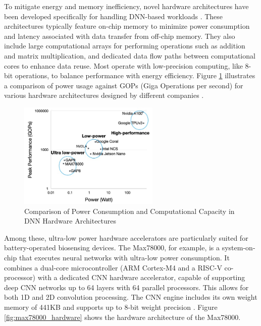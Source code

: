 \noindent To mitigate energy and memory inefficiency, novel hardware architectures have been developed specifically for handling DNN-based workloads \cite{Moss2023, Reuther2021}. These architectures typically feature on-chip memory to minimize power consumption and latency associated with data transfer from off-chip memory. They also include large computational arrays for performing operations such as addition and matrix multiplication, and dedicated data flow paths between computational cores to enhance data reuse. Most operate with low-precision computing, like 8-bit operations, to balance performance with energy efficiency. Figure \ref{fig:dnn_hardware_comparison} illustrates a comparison of power usage against GOPs (Giga Operations per second) for various hardware architectures designed by different companies \cite{Moss2023}.\\

\begin{figure}[h]
	\centering
	\includegraphics[width=0.6\textwidth]{images/power vs gops}
	\caption{Comparison of Power Consumption and Computational Capacity in DNN Hardware Architectures~\cite{Moss2023}}
	\label{fig:dnn_hardware_comparison}
\end{figure}

\noindent Among these, ultra-low power hardware accelerators are particularly suited for battery-operated biosensing devices. The Max78000, for example, is a system-on-chip that executes neural networks with ultra-low power consumption. It combines a dual-core microcontroller (ARM Cortex-M4 and a RISC-V co-processor) with a dedicated CNN hardware accelerator, capable of supporting deep CNN networks up to 64 layers with 64 parallel processors. This allows for both 1D and 2D convolution processing. The CNN engine includes its own weight memory of 441KB and supports up to 8-bit weight precision \cite{MAX78000-datasheet}. Figure \ref{fig:max78000_hardware} shows the hardware architecture of the Max78000.

